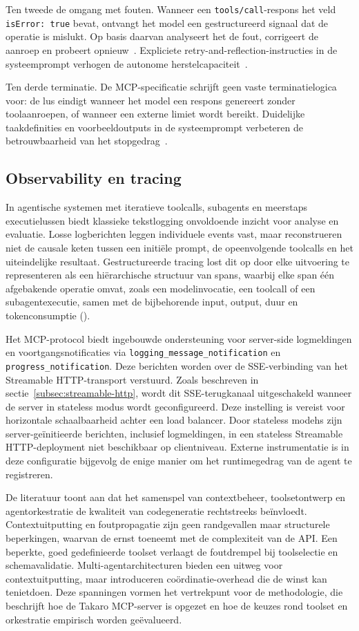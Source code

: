 Ten tweede de omgang met fouten. Wanneer een \texttt{tools/call}-respons het veld \texttt{isError: true} bevat, ontvangt het model een gestructureerd signaal dat de operatie is mislukt. Op basis daarvan analyseert het de fout, corrigeert de aanroep en probeert opnieuw~\cite{mcpspec2025}. Expliciete retry-and-reflection-instructies in de systeemprompt verhogen de autonome herstelcapaciteit~\cite{Fan2025MCPToolBenchPP}.

Ten derde terminatie. De MCP-specificatie schrijft geen vaste terminatielogica voor: de lus eindigt wanneer het model een respons genereert zonder toolaanroepen, of wanneer een externe limiet wordt bereikt. Duidelijke taakdefinities en voorbeeldoutputs in de systeemprompt verbeteren de betrouwbaarheid van het stopgedrag~\cite{Luo2025MCPUniverse}.

\subsection{Observability en tracing}\label{subsec:observability}

In agentische systemen met iteratieve toolcalls, subagents en meerstaps executielussen biedt klassieke tekstlogging onvoldoende inzicht voor analyse en evaluatie. Losse logberichten leggen individuele events vast, maar reconstrueren niet de causale keten tussen een initiële prompt, de opeenvolgende toolcalls en het uiteindelijke resultaat. Gestructureerde tracing lost dit op door elke uitvoering te representeren als een hiërarchische structuur van spans, waarbij elke span één afgebakende operatie omvat, zoals een modelinvocatie, een toolcall of een subagentexecutie, samen met de bijbehorende input, output, duur en tokenconsumptie (\cite{adimulam2026orchestration}).

Het MCP-protocol biedt ingebouwde ondersteuning voor server-side logmeldingen en voortgangsnotificaties via \texttt{logging\_message\_notification} en \texttt{progress\_notification}. Deze berichten worden over de SSE-verbinding van het Streamable HTTP-transport verstuurd. Zoals beschreven in sectie~\ref{subsec:streamable-http}, wordt dit SSE-terugkanaal uitgeschakeld wanneer de server in stateless modus wordt geconfigureerd. Deze instelling is vereist voor horizontale schaalbaarheid achter een load balancer. Door stateless modehs zijn server-geïnitieerde berichten, inclusief logmeldingen, in een stateless Streamable HTTP-deployment niet beschikbaar op clientniveau. Externe instrumentatie is in deze configuratie bijgevolg de enige manier om het runtimegedrag van de agent te registreren.

De literatuur toont aan dat het samenspel van contextbeheer, toolsetontwerp en agentorkestratie de kwaliteit van codegeneratie rechtstreeks beïnvloedt. Contextuitputting en foutpropagatie zijn geen randgevallen maar structurele beperkingen, waarvan de ernst toeneemt met de complexiteit van de API. Een beperkte, goed gedefinieerde toolset verlaagt de foutdrempel bij toolselectie en schemavalidatie. Multi-agentarchitecturen bieden een uitweg voor contextuitputting, maar introduceren coördinatie-overhead die de winst kan tenietdoen. Deze spanningen vormen het vertrekpunt voor de methodologie, die beschrijft hoe de Takaro MCP-server is opgezet en hoe de keuzes rond toolset en orkestratie empirisch worden geëvalueerd.
